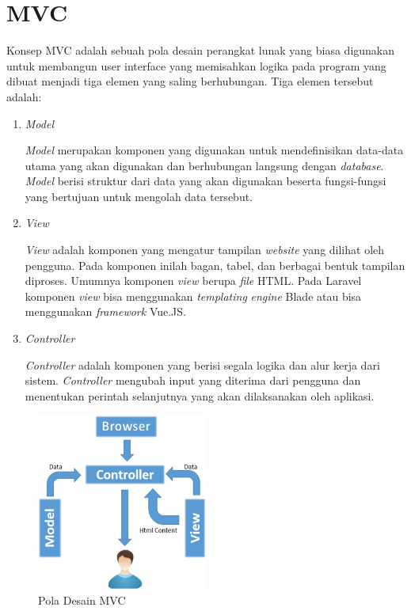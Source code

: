 \section{MVC}

		Konsep MVC adalah sebuah pola desain perangkat lunak yang biasa digunakan untuk membangun user interface yang memisahkan logika pada program yang dibuat menjadi tiga elemen yang saling berhubungan. Tiga elemen tersebut adalah:

\begin{enumerate}

	\item \textit{Model}

	\textit{Model} merupakan komponen yang digunakan untuk mendefinisikan data-data utama yang akan digunakan dan berhubungan langsung dengan \textit{database}. \textit{Model} berisi struktur dari data yang akan digunakan beserta fungsi-fungsi yang bertujuan untuk mengolah data tersebut.

	\item \textit{View}

	\textit{View} adalah komponen yang mengatur tampilan \textit{website} yang dilihat oleh pengguna. Pada komponen inilah bagan, tabel, dan berbagai bentuk tampilan diproses. Umumnya komponen \textit{view} berupa \textit{file} HTML. Pada Laravel komponen \textit{view} bisa menggunakan \textit{templating} \textit{engine} Blade atau bisa menggunakan \textit{framework} Vue.JS.

	\item \textit{Controller}

	\textit{Controller} adalah komponen yang berisi segala logika dan alur kerja dari sistem. \textit{Controller} mengubah input yang diterima dari pengguna dan menentukan perintah selanjutnya yang akan dilaksanakan oleh aplikasi.

\end{enumerate}

		
\begin{figure}[h!]
	\centering
	\includegraphics[width=0.5\textwidth]{gambar/mvc}
	\caption{Pola Desain MVC}
\end{figure}


